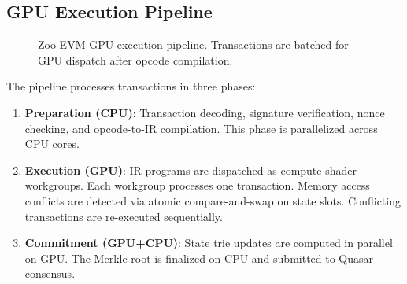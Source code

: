 \documentclass[11pt,letterpaper]{article}
\begin{document}
\subsection{GPU Execution Pipeline}

\begin{figure}[t]
\centering
{}
\caption{Zoo EVM GPU execution pipeline. Transactions are batched for GPU dispatch after opcode compilation.}
\label{fig:pipeline}
\end{figure}

The pipeline processes transactions in three phases:

\begin{enumerate}
    \item \textbf{Preparation (CPU)}: Transaction decoding, signature verification, nonce checking, and opcode-to-IR compilation. This phase is parallelized across CPU cores.

    \item \textbf{Execution (GPU)}: IR programs are dispatched as compute shader workgroups. Each workgroup processes one transaction. Memory access conflicts are detected via atomic compare-and-swap on state slots. Conflicting transactions are re-executed sequentially.

    \item \textbf{Commitment (GPU+CPU)}: State trie updates are computed in parallel on GPU. The Merkle root is finalized on CPU and submitted to Quasar consensus.
\end{enumerate}
\end{document}
